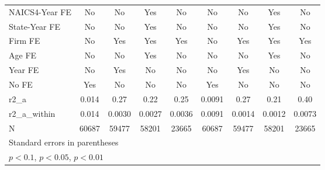 {\begin{tabular}{l*{8}{c}}
\addlinespace
NAICS4-Year FE      &          No         &          No         &         Yes         &          No         &          No         &          No         &         Yes         &          No         \\
\addlinespace
State-Year FE       &          No         &          No         &         Yes         &          No         &          No         &          No         &         Yes         &          No         \\
\addlinespace
Firm FE             &          No         &         Yes         &         Yes         &         Yes         &          No         &         Yes         &         Yes         &         Yes         \\
\addlinespace
Age FE              &          No         &          No         &         Yes         &          No         &          No         &          No         &         Yes         &          No         \\
\addlinespace
Year FE             &          No         &         Yes         &          No         &          No         &          No         &         Yes         &          No         &          No         \\
\addlinespace
No FE               &         Yes         &          No         &          No         &          No         &         Yes         &          No         &          No         &          No         \\
\midrule
r2\_a                &       0.014         &        0.27         &        0.22         &        0.25         &      0.0091         &        0.27         &        0.21         &        0.40         \\
r2\_a\_within         &       0.014         &      0.0030         &      0.0027         &      0.0036         &      0.0091         &      0.0014         &      0.0012         &      0.0073         \\
N                   &       60687         &       59477         &       58201         &       23665         &       60687         &       59477         &       58201         &       23665         \\
\bottomrule
\multicolumn{9}{l}{\footnotesize Standard errors in parentheses}\\
\multicolumn{9}{l}{\footnotesize \sym{*} \(p<0.1\), \sym{**} \(p<0.05\), \sym{***} \(p<0.01\)}\\
\end{tabular}
}
